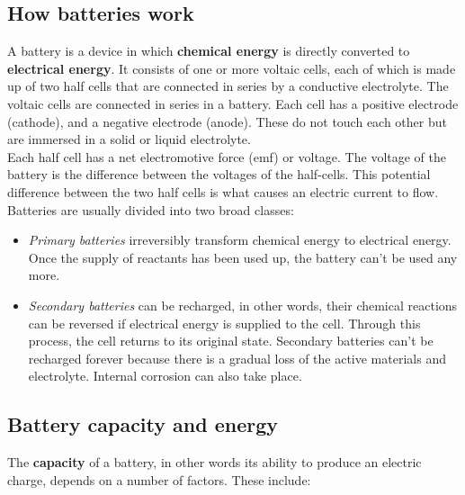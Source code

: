 \subsection{How batteries work}

A battery is a device in which \textbf{chemical energy} is directly converted to \textbf{electrical energy}. It consists of one or more voltaic cells, each of which is made up of two half cells that are connected in series by a conductive electrolyte. The voltaic cells are connected in series in a battery. Each cell has a positive electrode (cathode), and a negative electrode (anode). These do not touch each other but are immersed in a solid or liquid electrolyte.\\

Each half cell has a net electromotive force (emf) or voltage. The voltage of the battery is the difference between the voltages of the half-cells. This potential difference between the two half cells is what causes an electric current to flow. \\

Batteries are usually divided into two broad classes:

\begin{itemize}
\item{\textit{Primary batteries} irreversibly transform chemical energy to electrical energy. Once the supply of reactants has been used up, the battery can't be used any more.}
 
\item{\textit{Secondary batteries} can be recharged, in other words, their chemical reactions can be reversed if electrical energy is supplied to the cell. Through this process, the cell returns to its original state. Secondary batteries can't be recharged forever because there is a gradual loss of the active materials and electrolyte. Internal corrosion can also take place.}
\end{itemize}

\subsection{Battery capacity and energy}

The \textbf{capacity} of a battery, in other words its ability to produce an electric charge, depends on a number of factors. These include:

